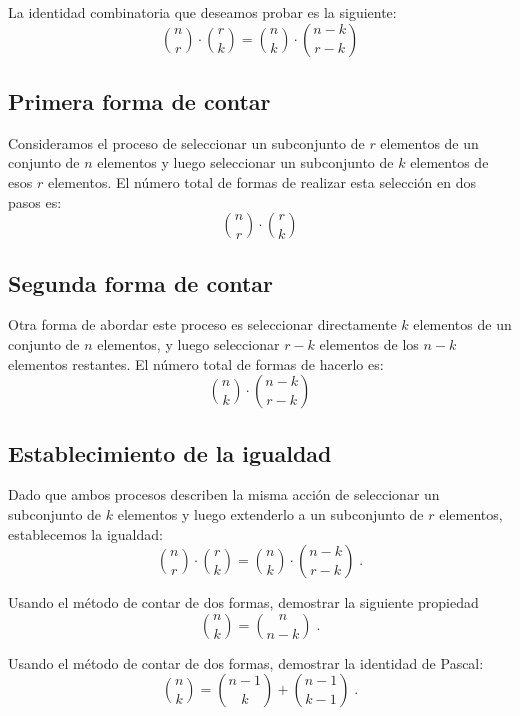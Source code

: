 \begin{ejemplo}
La identidad combinatoria que deseamos probar es la siguiente:
\[ \binom{n}{r} \cdot \binom{r}{k} = \binom{n}{k} \cdot \binom{n-k}{r-k} \]
\end{ejemplo}

\begin{solucion}
\subsection*{Primera forma de contar}
Consideramos el proceso de seleccionar un subconjunto de \( r \) elementos de un conjunto de \( n \) elementos y luego seleccionar un subconjunto de \( k \) elementos de esos \( r \) elementos. El número total de formas de realizar esta selección en dos pasos es:
\[ \binom{n}{r} \cdot \binom{r}{k} \]

\subsection*{Segunda forma de contar}
Otra forma de abordar este proceso es seleccionar directamente \( k \) elementos de un conjunto de \( n \) elementos, y luego seleccionar \( r-k \) elementos de los \( n-k \) elementos restantes. El número total de formas de hacerlo es:
\[ \binom{n}{k} \cdot \binom{n-k}{r-k} \]

\subsection*{Establecimiento de la igualdad}
Dado que ambos procesos describen la misma acción de seleccionar un subconjunto de \( k \) elementos y luego extenderlo a un subconjunto de \( r \) elementos, establecemos la igualdad:
\[ \binom{n}{r} \cdot \binom{r}{k} = \binom{n}{k} \cdot \binom{n-k}{r-k}\;.\]
\end{solucion}

\begin{tcolorbox}[colback=black!5!white,colframe=black!75!black,title=Ejercicio]
  Usando el método de contar de dos formas, demostrar la siguiente propiedad
  \[\binom{n}{k}=\binom{n}{n-k}\;.\]
  \vspace{5cm}
\end{tcolorbox}

\begin{tcolorbox}[colback=black!5!white,colframe=black!75!black,title=Ejercicio]
  Usando el método de contar de dos formas, demostrar la identidad de Pascal:
  \[\binom{n}{k}=\binom{n-1}{k}+\binom{n-1}{k-1}\;.\]
  \vspace{8cm}
\end{tcolorbox}

